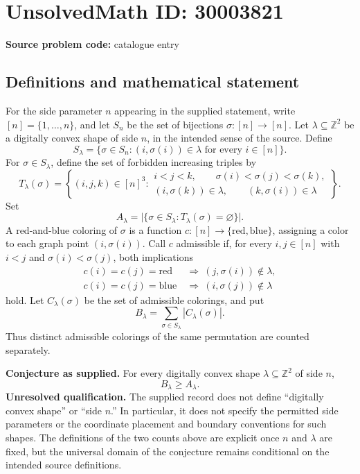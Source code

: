 \documentclass[11pt]{article}
\newcommand{\Z}{\mathbb{Z}}
\begin{document}
\section*{UnsolvedMath ID: 30003821}
\textbf{Source problem code:} catalogue entry
\subsection{Definitions and mathematical statement}
For the side parameter \(n\) appearing in the supplied statement, write \([n]=\{1,\ldots,n\}\), and let \(S_n\) be the set of bijections \(\sigma:[n]\to[n]\). Let \(\lambda\subseteq\Z^2\) be a digitally convex shape of side \(n\), in the intended sense of the source. Define
\[
S_\lambda=\{\sigma\in S_n:(i,\sigma(i))\in\lambda\text{ for every }i\in[n]\}.
\]
For \(\sigma\in S_\lambda\), define the set of forbidden increasing triples by
\[
T_\lambda(\sigma)=\left\{(i,j,k)\in[n]^3:
\begin{gathered}
i<j<k,\qquad \sigma(i)<\sigma(j)<\sigma(k),\\
(i,\sigma(k))\in\lambda,\qquad (k,\sigma(i))\in\lambda
\end{gathered}
\right\}.
\]
Set
\[
A_\lambda=\bigl|\{\sigma\in S_\lambda:T_\lambda(\sigma)=\varnothing\}\bigr|.
\]
A red-and-blue coloring of \(\sigma\) is a function \(c:[n]\to\{\mathrm{red},\mathrm{blue}\}\), assigning a color to each graph point \((i,\sigma(i))\). Call \(c\) admissible if, for every \(i,j\in[n]\) with \(i<j\) and \(\sigma(i)<\sigma(j)\), both implications
\[
\begin{aligned}
c(i)=c(j)=\mathrm{red}&\ \Longrightarrow\ (j,\sigma(i))\notin\lambda,\\
c(i)=c(j)=\mathrm{blue}&\ \Longrightarrow\ (i,\sigma(j))\notin\lambda
\end{aligned}
\]
hold. Let \(C_\lambda(\sigma)\) be the set of admissible colorings, and put
\[
B_\lambda=\sum_{\sigma\in S_\lambda}|C_\lambda(\sigma)|.
\]
Thus distinct admissible colorings of the same permutation are counted separately.

\textbf{Conjecture as supplied.} For every digitally convex shape \(\lambda\subseteq\Z^2\) of side \(n\),
\[
B_\lambda\geq A_\lambda.
\]
\textbf{Unresolved qualification.} The supplied record does not define ``digitally convex shape'' or ``side \(n\).'' In particular, it does not specify the permitted side parameters or the coordinate placement and boundary conventions for such shapes. The definitions of the two counts above are explicit once \(n\) and \(\lambda\) are fixed, but the universal domain of the conjecture remains conditional on the intended source definitions.
\end{document}
